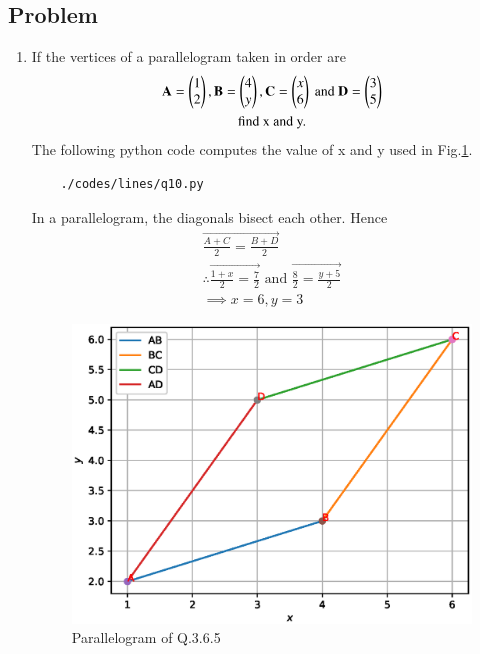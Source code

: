 \subsection{Problem}

\renewcommand{\theequation}{\theenumi}
\begin{enumerate}[label=\thesection.\arabic*.,ref=\thesection.\theenumi]
	\item If the vertices of a parallelogram taken in order are
	\begin{multline}
\mathbf{A}=\begin{pmatrix}1\\2\end{pmatrix} , \mathbf{B}=\begin{pmatrix}4\\y\end{pmatrix} ,\mathbf{C}=\begin{pmatrix}x\\6\end{pmatrix}\text{ and }\mathbf{D}=\begin{pmatrix}3\\5\end{pmatrix}\\\text{find x and y.}
\end{multline}
	The following python code computes the value of x and y used in Fig.\ref{fig:qten}.
	\begin{lstlisting}
	./codes/lines/q10.py
	\end{lstlisting}
	
	\solution In a parallelogram, the diagonals bisect each other. Hence
	\begin{align}
		\vec{\frac{A+C}{2} = \frac{B+D}{2}}
		\\
\therefore \vec{\frac{1+x}{2} = \frac{7}{2}}\text{ and }\vec{\frac{8}{2} = \frac{y+5}{2}} \\
\implies x=6,y=3
\end{align}
	\begin{figure}[!ht]
	\centering
	\includegraphics[width=\columnwidth]{./figs/lines/q10.eps}
	\caption{Parallelogram of Q.3.6.5}
	\label{fig:qten}	
	\end{figure}
	
		
\end{enumerate}
